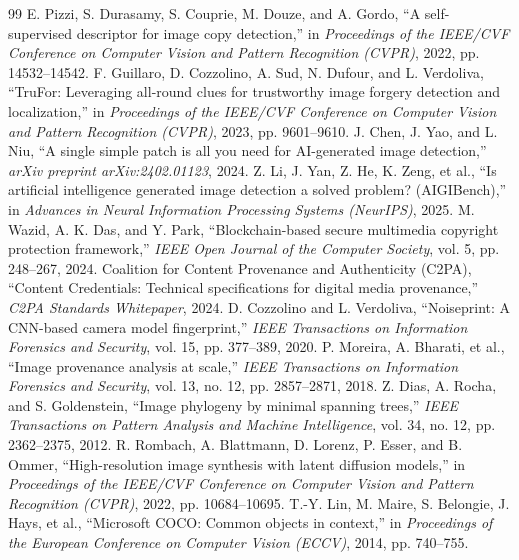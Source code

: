 \documentclass[12pt,a4paper]{article}
\begin{document}
\newpage
\begin{thebibliography}{99}
 E. Pizzi, S. Durasamy, S. Couprie, M. Douze, and A. Gordo, ``A self-supervised descriptor for image copy detection,'' in \textit{Proceedings of the IEEE/CVF Conference on Computer Vision and Pattern Recognition (CVPR)}, 2022, pp. 14532--14542.
 F. Guillaro, D. Cozzolino, A. Sud, N. Dufour, and L. Verdoliva, ``TruFor: Leveraging all-round clues for trustworthy image forgery detection and localization,'' in \textit{Proceedings of the IEEE/CVF Conference on Computer Vision and Pattern Recognition (CVPR)}, 2023, pp. 9601--9610.
 J. Chen, J. Yao, and L. Niu, ``A single simple patch is all you need for AI-generated image detection,'' \textit{arXiv preprint arXiv:2402.01123}, 2024.
 Z. Li, J. Yan, Z. He, K. Zeng, et al., ``Is artificial intelligence generated image detection a solved problem? (AIGIBench),'' in \textit{Advances in Neural Information Processing Systems (NeurIPS)}, 2025.
 M. Wazid, A. K. Das, and Y. Park, ``Blockchain-based secure multimedia copyright protection framework,'' \textit{IEEE Open Journal of the Computer Society}, vol. 5, pp. 248--267, 2024.
 Coalition for Content Provenance and Authenticity (C2PA), ``Content Credentials: Technical specifications for digital media provenance,'' \textit{C2PA Standards Whitepaper}, 2024.
 D. Cozzolino and L. Verdoliva, ``Noiseprint: A CNN-based camera model fingerprint,'' \textit{IEEE Transactions on Information Forensics and Security}, vol. 15, pp. 377--389, 2020.
 P. Moreira, A. Bharati, et al., ``Image provenance analysis at scale,'' \textit{IEEE Transactions on Information Forensics and Security}, vol. 13, no. 12, pp. 2857--2871, 2018.
 Z. Dias, A. Rocha, and S. Goldenstein, ``Image phylogeny by minimal spanning trees,'' \textit{IEEE Transactions on Pattern Analysis and Machine Intelligence}, vol. 34, no. 12, pp. 2362--2375, 2012.
 R. Rombach, A. Blattmann, D. Lorenz, P. Esser, and B. Ommer, ``High-resolution image synthesis with latent diffusion models,'' in \textit{Proceedings of the IEEE/CVF Conference on Computer Vision and Pattern Recognition (CVPR)}, 2022, pp. 10684--10695.
 T.-Y. Lin, M. Maire, S. Belongie, J. Hays, et al., ``Microsoft COCO: Common objects in context,'' in \textit{Proceedings of the European Conference on Computer Vision (ECCV)}, 2014, pp. 740--755.
\end{thebibliography}
\end{document}
